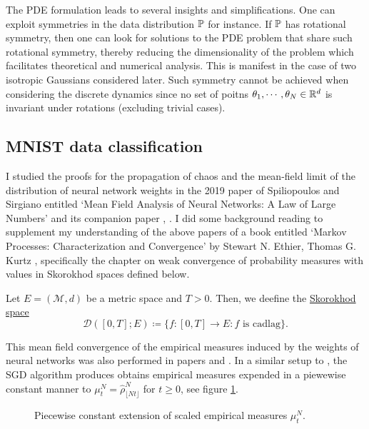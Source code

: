 \documentclass{article}
\begin{document}
The PDE formulation leads to several insights and simplifications. One can exploit symmetries in the data distribution $ \mathbb{P}$ for instance. If $ \mathbb{P}$ has rotational symmetry, then one can look for solutions to the PDE problem that share such rotational symmetry, thereby reducing the dimensionality of the problem which facilitates theoretical and numerical analysis. This is manifest in the case of two isotropic Gaussians considered later. Such symmetry cannot be achieved when considering the discrete dynamics since no set of poitns $ \mathbf{\theta}_{1}, \cdots, \mathbf{\theta}_{N}\in \mathbb{R}^{d}$ is invariant under rotations (excluding trivial cases).

\subsection{MNIST data classification}

I studied the proofs for the propagation of chaos and the mean-field limit of the distribution of neural network weights in the 2019 paper of Spiliopoulos and Sirgiano entitled ‘Mean Field Analysis of Neural Networks: A Law of Large Numbers’ and its companion paper \cite{sirignano2019meanfieldanalysislln}, \cite{sirignano2019meanfieldanalysisclt}. I did some background reading to supplement my understanding of the above papers of a book entitled ‘Markov Processes: Characterization and Convergence’ by Stewart N. Ethier, Thomas G. Kurtz \cite{ethier2009markov}, specifically the chapter on weak convergence of probability measures with values in Skorokhod spaces defined below.

\begin{boxdef}\label{def: skorokhod}
	Let $  E = (\mathcal{M}, d)$ be a metric space and $ T>0$. Then, we deefine the \underline{Skorokhod space} 
\begin{equation}
	\mathcal{D}([0,T]; E) \coloneqq \{f:[0,T]\to E: f \text{ is cadlag}\}.
\end{equation}

\end{boxdef}

This mean field convergence of the empirical measures induced by the weights of neural networks was also performed in papers \cite{sirignano2019meanfieldanalysisclt} and \cite{sirignano2019meanfieldanalysislln}. In a similar setup to \cite{Mei_2018}, the SGD algorithm produces obtains empirical measures expended in a piewewise constant manner to $\mu^{N}_{t} = \hat{\rho}^{N}_{\lfloor Nt \rfloor}$ for $ t\geq 0$, see figure \ref{fig: piecewise constant extension of function}. 
\begin{figure}[H]
    \centering
    
    \caption{Piecewise constant extension of scaled empirical measures $ \mu^{N}_{t}$.}
    \label{fig: piecewise constant extension of function}
\end{figure}
\end{document}
